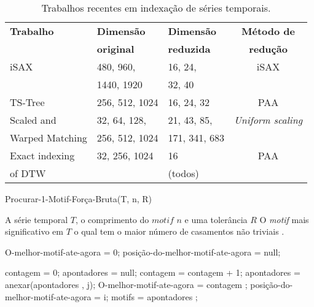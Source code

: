 
\begin{table}[htbp]
	\centering
	\caption{Trabalhos recentes em indexação de séries temporais.}
	\begin{tabular}{ | l | l | l | c | }
		\hline
		\textbf{  Trabalho  } & \textbf{Dimensão}&\textbf{Dimensão}&\textbf{Método de}\\
		\textbf{ } & \textbf{original}&\textbf{reduzida}&\textbf{redução}\\
		\hline
		iSAX \cite{iSAX} & 480, 960,  & 16, 24,  & iSAX \\
		& 1440, 1920  & 32, 40 & \\
		\hline
		TS-Tree \cite{TSTREE}  &256, 512, 1024  & 16, 24, 32 & PAA \\
		
		\hline
		Scaled and  & 32, 64, 128, & 21, 43, 85, & \textit{Uniform scaling} \\
		Warped Matching \cite{ScalingTimeSeriesQuerying}& 256, 512, 1024 & 171, 341, 683 & \\
		
		\hline
		Exact indexing&  32, 256, 1024 &    16  & PAA \\
		of DTW \cite{KeoghIndDTW} &    &   (todos) & \\
		\hline
	\end{tabular}
	\label{timeseriesIndexing}
\end{table}


\begin{algorithm}
    \caption{Procurar-1-Motif-Força-Bruta(T, n, R)}
    \begin{algorithmic}[1]
    \REQUIRE  A série temporal $T$, o comprimento do $motif$ $n$ e uma tolerância $R$
    \ENSURE   O \textit{motif}  mais significativo em $T$  o qual tem o maior número de casamentos não triviais .

   \STATE O-melhor-motif-ate-agora = 0;
    \STATE posição-do-melhor-motif-ate-agora = null;

        \STATE contagem = 0;
        \STATE apontadores  = null;
                \STATE contagem = contagem + 1;
                \STATE apontadores  = anexar(apontadores , j);
            \ENDIF
        \ENDFOR
            \STATE O-melhor-motif-ate-agora = contagem ;
            \STATE posição-do-melhor-motif-ate-agora = i;
            \STATE motifs = apontadores ;
        \ENDIF
    \ENDFOR
\end{algorithmic}
\label{alg:findmotifs}
\end{algorithm}

